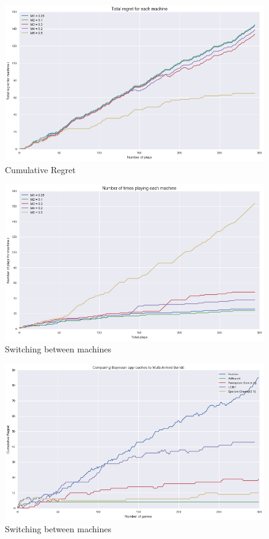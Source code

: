 \documentclass{article}
\begin{document}
\begin{figure}[H]
\centering
\includegraphics[scale=0.4]{UCB_regret.png}
\caption{Cumulative Regret}
\end{figure}


\begin{figure}[H]
\centering
\includegraphics[scale=0.4]{UCB_num_plays.png}
\caption{Switching between machines}
\end{figure}

\begin{figure}[H]
\centering
\includegraphics[scale=0.4]{all.png}
\caption{Switching between machines}
\end{figure}
\end{document}
